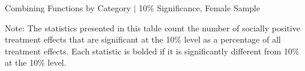 	\begin{sidewaystable}[H]
	\begin{threeparttable}
     \caption{Combining Functions by Category $|$ 10\% Significance, Female Sample} 
     \label{table:abccare_rslt_female_counts_n10a10_all}
	
	\begin{tablenotes}
	\footnotesize
	\item Note: The statistics presented in this table count the number of socially positive treatment 
	effects that are significant at the 10\% level as a percentage of all treatment effects. Each statistic
	is bolded if it is significantly different from 10\% at the 10\% level.
	\end{tablenotes}
	\end{threeparttable}
	\end{sidewaystable}   